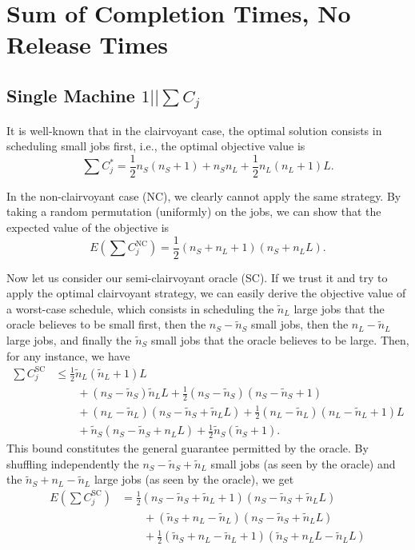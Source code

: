\documentclass{article}
\begin{document}
\section{Sum of Completion Times, No Release Times}

\subsection{Single Machine \(1||\sum C_j\)}

It is well-known that in the clairvoyant case, the optimal solution consists in scheduling small
jobs first, i.e., the optimal objective value is
\[
    \sum C_j^*=\frac{1}{2}n_S(n_S+1)+n_Sn_L+\frac{1}{2}n_L(n_L+1)L.
\]

In the non-clairvoyant case (NC), we clearly cannot apply the same strategy. By taking a random
permutation (uniformly) on the jobs, we can show that the expected value of the objective is
\[
    E(\sum C_j^{\mathrm{NC}})=\frac{1}{2}(n_S+n_L+1)(n_S+n_LL).
\]

Now let us consider our semi-clairvoyant oracle (SC). If we trust it and try to apply the optimal
clairvoyant strategy, we can easily derive the objective value of a worst-case schedule, which
consists in scheduling the \(\tilde{n}_L\) large jobs that the oracle believes to be small first,
then the \(n_S-\tilde{n}_S\) small jobs, then the \(n_L-\tilde{n}_L\) large jobs, and finally the
\(\tilde{n}_S\) small jobs that the oracle believes to be large. Then, for any instance, we have
\begin{align*}
    \sum C_j^{\mathrm{SC}}
        &\le\frac{1}{2}\tilde{n}_L(\tilde{n}_L+1)L\\
        &\qquad+(n_S-\tilde{n}_S)\tilde{n}_LL+\frac{1}{2}(n_S-\tilde{n}_S)(n_S-\tilde{n}_S+1)\\
        &\qquad+(n_L-\tilde{n}_L)(n_S-\tilde{n}_S+\tilde{n}_LL)+\frac{1}{2}(n_L-\tilde{n}_L)(n_L-\tilde{n}_L+1)L\\
        &\qquad+\tilde{n}_S(n_S-\tilde{n}_S+n_LL)+\frac{1}{2}\tilde{n}_S(\tilde{n}_S+1).
\end{align*}
This bound constitutes the general guarantee permitted by the oracle. By shuffling independently the
\(n_S-\tilde{n}_S+\tilde{n}_L\) small jobs (as seen by the oracle) and the
\(\tilde{n}_S+n_L-\tilde{n}_L\) large jobs (as seen by the oracle), we get
\begin{align*}
    E(\sum C_j^{\mathrm{SC}})
        &=\frac{1}{2}(n_S-\tilde{n}_S+\tilde{n}_L+1)(n_S-\tilde{n}_S+\tilde{n}_LL)\\
        &\qquad+(\tilde{n}_S+n_L-\tilde{n}_L)(n_S-\tilde{n}_S+\tilde{n}_LL)\\
        &\qquad+\frac{1}{2}(\tilde{n}_S+n_L-\tilde{n}_L+1)(\tilde{n}_S+n_LL-\tilde{n}_LL)
\end{align*}
\end{document}
